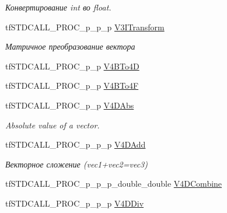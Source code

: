 \begin{DoxyCompactItemize}
\begin{DoxyCompactList}\small\item\em Конвертирование int во float. \end{DoxyCompactList}\item 
\hypertarget{structs_functions_vector_c_p_u_a41a8683dd166ed4b73a7a808599034b4}{tf\-S\-T\-D\-C\-A\-L\-L\-\_\-\-P\-R\-O\-C\-\_\-p\-\_\-p\-\_\-p \hyperlink{structs_functions_vector_c_p_u_a41a8683dd166ed4b73a7a808599034b4}{V3\-I\-Transform}}\label{structs_functions_vector_c_p_u_a41a8683dd166ed4b73a7a808599034b4}

\begin{DoxyCompactList}\small\item\em Матричное преобразование вектора \end{DoxyCompactList}\item 
tf\-S\-T\-D\-C\-A\-L\-L\-\_\-\-P\-R\-O\-C\-\_\-p\-\_\-p \hyperlink{structs_functions_vector_c_p_u_a26408f37bdf3ab2e7f3b8b0cd17f6b30}{V4\-B\-To4\-D}
\item 
tf\-S\-T\-D\-C\-A\-L\-L\-\_\-\-P\-R\-O\-C\-\_\-p\-\_\-p \hyperlink{structs_functions_vector_c_p_u_ac2aee16ff45102e4ed7a56a3e8c213d9}{V4\-B\-To4\-F}
\item 
\hypertarget{structs_functions_vector_c_p_u_a21afa557ac004f7ad9a280319bf56716}{tf\-S\-T\-D\-C\-A\-L\-L\-\_\-\-P\-R\-O\-C\-\_\-p\-\_\-p \hyperlink{structs_functions_vector_c_p_u_a21afa557ac004f7ad9a280319bf56716}{V4\-D\-Abs}}\label{structs_functions_vector_c_p_u_a21afa557ac004f7ad9a280319bf56716}

\begin{DoxyCompactList}\small\item\em Absolute value of a vector. \end{DoxyCompactList}\item 
\hypertarget{structs_functions_vector_c_p_u_aadcb42146ee802253e840f037cac3f2c}{tf\-S\-T\-D\-C\-A\-L\-L\-\_\-\-P\-R\-O\-C\-\_\-p\-\_\-p\-\_\-p \hyperlink{structs_functions_vector_c_p_u_aadcb42146ee802253e840f037cac3f2c}{V4\-D\-Add}}\label{structs_functions_vector_c_p_u_aadcb42146ee802253e840f037cac3f2c}

\begin{DoxyCompactList}\small\item\em Векторное сложение (vec1+vec2=vec3) \end{DoxyCompactList}\item 
tf\-S\-T\-D\-C\-A\-L\-L\-\_\-\-P\-R\-O\-C\-\_\-p\-\_\-p\-\_\-p\-\_\-double\-\_\-double \hyperlink{structs_functions_vector_c_p_u_a0bb14800e832c773a886e41947996171}{V4\-D\-Combine}
\item 
\hypertarget{structs_functions_vector_c_p_u_a912759c0c7431b39e2f18a710896390e}{tf\-S\-T\-D\-C\-A\-L\-L\-\_\-\-P\-R\-O\-C\-\_\-p\-\_\-p\-\_\-p \hyperlink{structs_functions_vector_c_p_u_a912759c0c7431b39e2f18a710896390e}{V4\-D\-Div}}\label{structs_functions_vector_c_p_u_a912759c0c7431b39e2f18a710896390e}


\end{DoxyCompactItemize}
